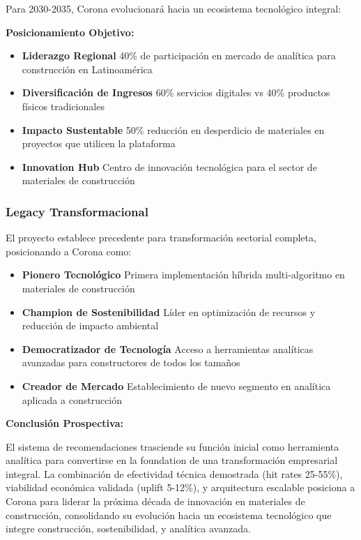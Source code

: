 \documentclass[twocolumn]{article}
\begin{document}
Para 2030-2035, Corona evolucionará hacia un ecosistema tecnológico integral:

\textbf{Posicionamiento Objetivo:}
\begin{itemize}
    \item \textbf{Liderazgo Regional} 40\% de participación en mercado de analítica para construcción en Latinoamérica
    \item \textbf{Diversificación de Ingresos} 60\% servicios digitales vs 40\% productos físicos tradicionales
    \item \textbf{Impacto Sustentable} 50\% reducción en desperdicio de materiales en proyectos que utilicen la plataforma
    \item \textbf{Innovation Hub} Centro de innovación tecnológica para el sector de materiales de construcción
\end{itemize}

\subsubsection{Legacy Transformacional}

El proyecto establece precedente para transformación sectorial completa, posicionando a Corona como:

\begin{itemize}
    \item \textbf{Pionero Tecnológico} Primera implementación híbrida multi-algoritmo en materiales de construcción
    \item \textbf{Champion de Sostenibilidad} Líder en optimización de recursos y reducción de impacto ambiental
    \item \textbf{Democratizador de Tecnología} Acceso a herramientas analíticas avanzadas para constructores de todos los tamaños
    \item \textbf{Creador de Mercado} Establecimiento de nuevo segmento en analítica aplicada a construcción
\end{itemize}

\textbf{Conclusión Prospectiva:}

El sistema de recomendaciones trasciende su función inicial como herramienta analítica para convertirse en la foundation de una transformación empresarial integral. La combinación de efectividad técnica demostrada (hit rates 25-55\%), viabilidad económica validada (uplift 5-12\%), y arquitectura escalable posiciona a Corona para liderar la próxima década de innovación en materiales de construcción, consolidando su evolución hacia un ecosistema tecnológico que integre construcción, sostenibilidad, y analítica avanzada.
\end{document}
